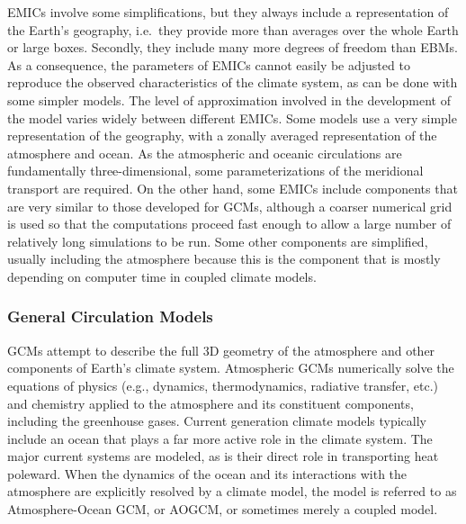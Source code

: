 \documentclass[12pt,oneside]{book}
\begin{document}
EMICs involve some simplifications, but they always include a
representation of the Earth's geography, i.e.~they provide more than
averages over the whole Earth or large boxes. Secondly, they include
many more degrees of freedom than EBMs. As a consequence, the parameters
of EMICs cannot easily be adjusted to reproduce the observed
characteristics of the climate system, as can be done with some simpler
models. The level of approximation involved in the development of the
model varies widely between different EMICs. Some models use a very
simple representation of the geography, with a zonally averaged
representation of the atmosphere and ocean. As the atmospheric and
oceanic circulations are fundamentally three-dimensional, some
parameterizations of the meridional transport are required. On the other
hand, some EMICs include components that are very similar to those
developed for GCMs, although a coarser numerical grid is used so that
the computations proceed fast enough to allow a large number of
relatively long simulations to be run. Some other components are
simplified, usually including the atmosphere because this is the
component that is mostly depending on computer time in coupled climate
models.

\subsubsection{General Circulation
Models}\label{general-circulation-models}

GCMs attempt to describe the full 3D geometry of the atmosphere and
other components of Earth's climate system. Atmospheric GCMs numerically
solve the equations of physics (e.g., dynamics, thermodynamics,
radiative transfer, etc.) and chemistry applied to the atmosphere and
its constituent components, including the greenhouse gases. Current
generation climate models typically include an ocean that plays a far
more active role in the climate system. The major current systems are
modeled, as is their direct role in transporting heat poleward. When the
dynamics of the ocean and its interactions with the atmosphere are
explicitly resolved by a climate model, the model is referred to as
Atmosphere-Ocean GCM, or AOGCM, or sometimes merely a coupled model.
\end{document}
